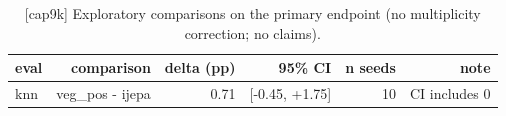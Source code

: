 \begin{table}[t]
\centering
\small
\caption{[cap9k] Exploratory comparisons on the primary endpoint (no multiplicity correction; no claims).}
\label{tab:exploratory_comparisons}
\begin{tabular}{lrrrrr}
\toprule
eval & comparison & delta (pp) & 95\% CI & n seeds & note \\
\midrule
knn & veg\_pos - ijepa & 0.71 & [-0.45, +1.75] & 10 & CI includes 0 \\
\bottomrule
\end{tabular}
\end{table}
